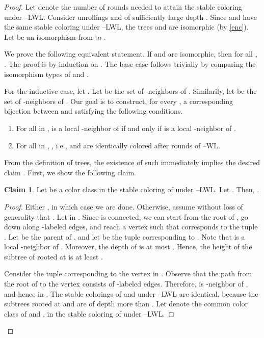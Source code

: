 \documentclass{article}
\theoremstyle{definition}
\newcommand{\deltakwl}{--\textsf{WL}\xspace}
\newcommand{\pluskwl}{--\textsf{LWL}\xspace}
\newtheorem{claim}[theorem]{Claim}
\begin{document}
\begin{proof}  
	Let  denote the number of rounds needed to attain the stable coloring under \pluskwl. Consider unrollings  and  of sufficiently large depth . Since  and  have the same stable coloring under \pluskwl, the trees  and  are isomorphic (by \cref{enc}). Let  be an isomorphism from  to . 
	
	We prove the following equivalent statement. If  and  are isomorphic, then for all , .
	The proof is by induction on . The base case  follows trivially by comparing the isomorphism types of  and . 
	
	For the inductive case, let . Let  be the set of -neighbors of . Similarily, let  be the set of -neighbors of . Our goal is to construct, for every , a corresponding bijection  between  and  satisfying the following conditions.
	
	\begin{enumerate}
		\item For all  in ,  is a local -neighbor of  if and only if  is a local -neighbor of . 
		\item For all  in , , i.e.,  and  are identically colored after  rounds of \deltakwl.
	\end{enumerate} 
	
	From the definition of  trees, the existence of such  immediately implies the desired claim . First, we show the following claim. 
	
	\begin{claim}
		Let  be a color class in the stable coloring of  under \pluskwl. 
		Let . Then, .
	\end{claim}
	
	\begin{proof}
		Either , in which case we are done. Otherwise, assume without loss of generality that . Let  in . Since  is connected, we can start from the root  of , go down along -labeled edges, and reach a vertex  such that  corresponds to the tuple . Let  be the parent of , and let  be the tuple corresponding to . Note that  is a local -neighbor of . Moreover, the depth of  is at most . Hence, the height of the subtree of  rooted at  is at least .  
		
		Consider the tuple  corresponding to the vertex  in . Observe that the path from the root  of  to the vertex  consists of -labeled edges. Therefore,  is -neighbor of , and hence  in . The stable colorings of  and  under \pluskwl are identical, because the subtrees rooted at  and  are of depth more than . Let  denote the common color class of  and , in the stable coloring of  under \pluskwl.
		

\end{proof}
\end{proof}
\end{document}
